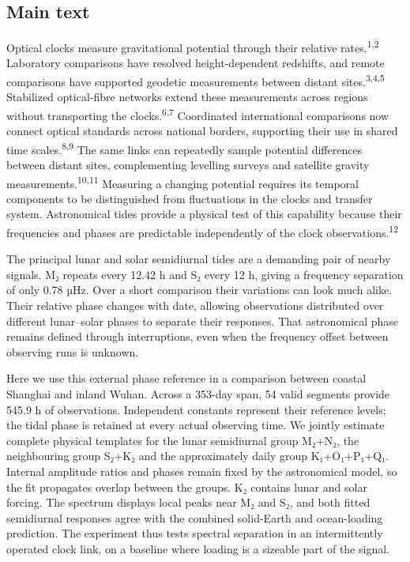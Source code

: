 \documentclass[
  10pt,
  a4paper,
]{article}
\begin{document}
\hypertarget{main-text}{%
\subsection{Main text}\label{main-text}}

Optical clocks measure gravitational potential through their relative
rates.\textsuperscript{1,2} Laboratory comparisons have resolved
height-dependent redshifts, and remote comparisons have supported
geodetic measurements between distant sites.\textsuperscript{3,4,5}
Stabilized optical-fibre networks extend these measurements across
regions without transporting the clocks.\textsuperscript{6,7}
Coordinated international comparisons now connect optical standards
across national borders, supporting their use in shared time
scales.\textsuperscript{8,9} The same links can repeatedly sample
potential differences between distant sites, complementing levelling
surveys and satellite gravity measurements.\textsuperscript{10,11}
Measuring a changing potential requires its temporal components to be
distinguished from fluctuations in the clocks and transfer system.
Astronomical tides provide a physical test of this capability because
their frequencies and phases are predictable independently of the clock
observations.\textsuperscript{12}

The principal lunar and solar semidiurnal tides are a demanding pair of
nearby signals. M₂ repeats every 12.42 h and S₂ every 12 h, giving a
frequency separation of only 0.78 µHz. Over a short comparison their
variations can look much alike. Their relative phase changes with date,
allowing observations distributed over different lunar--solar phases to
separate their responses. That astronomical phase remains defined
through interruptions, even when the frequency offset between observing
runs is unknown.

Here we use this external phase reference in a comparison between
coastal Shanghai and inland Wuhan. Across a 353-day span, 54 valid
segments provide 545.9 h of observations. Independent constants
represent their reference levels; the tidal phase is retained at every
actual observing time. We jointly estimate complete physical templates
for the lunar semidiurnal group M₂+N₂, the neighbouring group S₂+K₂ and
the approximately daily group K₁+O₁+P₁+Q₁. Internal amplitude ratios and
phases remain fixed by the astronomical model, so the fit propagates
overlap between the groups. K₂ contains lunar and solar forcing. The
spectrum displays local peaks near M₂ and S₂, and both fitted
semidiurnal responses agree with the combined solid-Earth and
ocean-loading prediction. The experiment thus tests spectral separation
in an intermittently operated clock link, on a baseline where loading is
a sizeable part of the signal.
\end{document}
